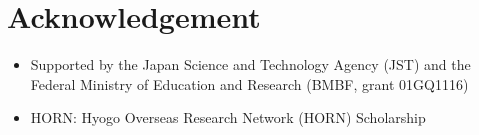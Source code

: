 \documentclass{frontiersSCNS} %
\begin{document}

\section*{Acknowledgement}
\begin{itemize}
\item Supported by the Japan Science and Technology Agency (JST) and the
      Federal Ministry of Education and Research (BMBF, grant 01GQ1116)
\item HORN: Hyogo Overseas Research Network (HORN) Scholarship
\end{itemize}









\end{document}
